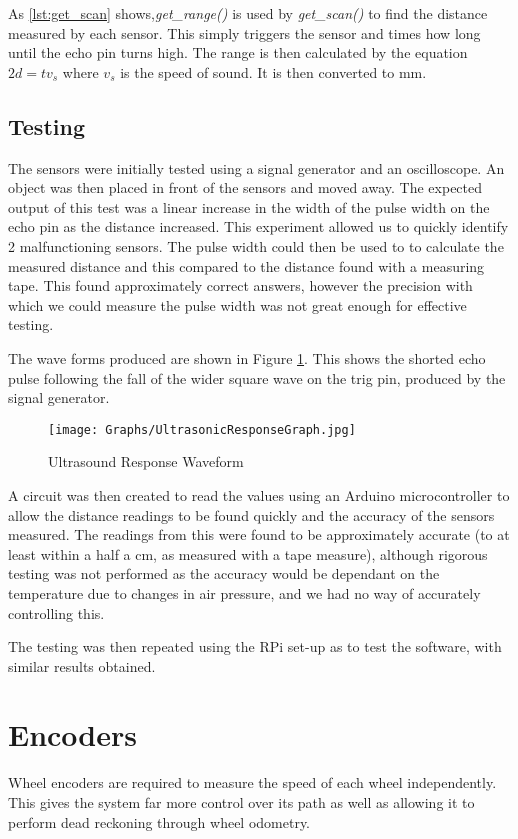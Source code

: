 As \ref{lst:get_scan} shows,\textit{get\_range()} is used by \textit{get\_scan()} to find the distance measured by each sensor. This simply triggers the sensor and times how long until the echo pin turns high. The range is then calculated by the equation $ 2d = tv_s$ where $v_s$ is the speed of sound. It is then converted to mm.

\subsection{Testing}\label{elec/range/test}
The sensors were initially tested using a signal generator and an 
oscilloscope. An object was then placed in front of the sensors 
and moved away. The expected output of this test was a linear increase
in the width of the pulse width on the echo pin as the distance increased.
This experiment allowed us to quickly identify 2 malfunctioning sensors. The pulse width could then be used to to calculate the measured distance
and this compared to the distance found with a measuring tape. This found 
approximately correct answers, however the precision with which we could 
measure the pulse width was not great enough for effective testing. 

The wave forms produced are shown in Figure \ref{UltrasoundWaveform}. This shows the shorted echo pulse following the fall of the wider square wave on the trig pin, produced by the signal generator. 

\begin{figure}[!ht]
	\centering
	\texttt{[image: Graphs/UltrasonicResponseGraph.jpg]}
	\caption{Ultrasound Response Waveform}\label{UltrasoundWaveform}

\end{figure}

A circuit was then created to read the values using an Arduino microcontroller to allow the distance readings to be found quickly and the accuracy of the sensors measured. The readings from this were found to be approximately accurate (to at least within a half a cm, as measured with a tape measure), although rigorous testing was not performed as the accuracy would be dependant on the temperature due to changes in air pressure, and we had no way of accurately controlling this. 

The testing was then repeated using the RPi set-up as to test the software, with similar results obtained.

\section{Encoders}\label{elec/encoder}
Wheel encoders are required to measure the speed of each wheel independently. This gives the system far more control over its path as well as allowing it to perform dead reckoning through wheel odometry. 
